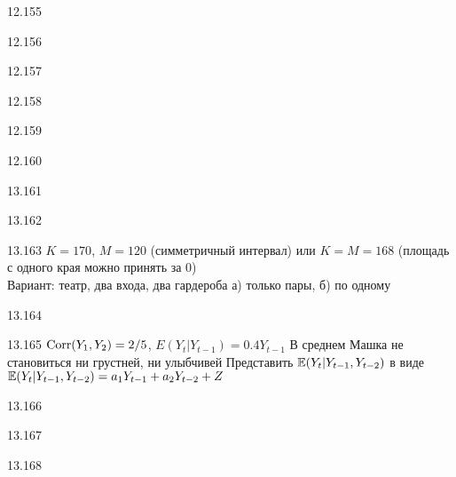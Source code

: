 \begin{solution}{{12.155}}
\end{solution}
\protect \hypertarget {soln:12.156}{}
\begin{solution}{{12.156}}
\end{solution}
\protect \hypertarget {soln:12.157}{}
\begin{solution}{{12.157}}
\end{solution}
\protect \hypertarget {soln:12.158}{}
\begin{solution}{{12.158}}
\end{solution}
\protect \hypertarget {soln:12.159}{}
\begin{solution}{{12.159}}
\end{solution}
\protect \hypertarget {soln:12.160}{}
\begin{solution}{{12.160}}
\end{solution}
\protect \hypertarget {soln:13.161}{}
\begin{solution}{{13.161}}
\end{solution}
\protect \hypertarget {soln:13.162}{}
\begin{solution}{{13.162}}
\end{solution}
\protect \hypertarget {soln:13.163}{}
\begin{solution}{{13.163}}
  $K=170$, $M=120$ (симметричный интервал) или $K=M=168$ (площадь с одного края можно принять за 0) \\
  Вариант: театр, два входа, два гардероба а) только пары, б) по одному
\end{solution}
\protect \hypertarget {soln:13.164}{}
\begin{solution}{{13.164}}
\end{solution}
\protect \hypertarget {soln:13.165}{}
\begin{solution}{{13.165}}
  $\operatorname{Corr}(Y_1, Y_2) = 2/5$, $E(Y_t | Y_{t-1}) = 0.4 Y_{t-1}$
  В среднем Машка не становиться ни грустней, ни улыбчивей
  Представить $\mathbb{E}(Y_t | Y_{t-1}, Y_{t-2})$ в виде $\mathbb{E}(Y_t | Y_{t-1}, Y_{t-2}) = a_1 Y_{t-1} + a_2 Y_{t-2} + Z$
\end{solution}
\protect \hypertarget {soln:13.166}{}
\begin{solution}{{13.166}}
\end{solution}
\protect \hypertarget {soln:13.167}{}
\begin{solution}{{13.167}}
\end{solution}
\protect \hypertarget {soln:13.168}{}
\begin{solution}{{13.168}}
\end{solution}

